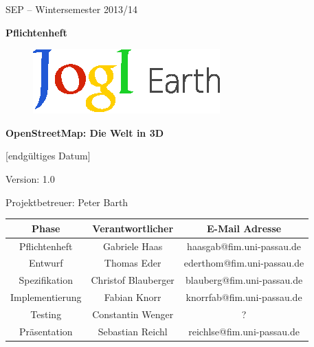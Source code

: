 \documentclass[10pt]{scrreprt}
\begin{document}
\begin{center}
\vspace{2.0 cm}
{\LARGE SEP – Wintersemester 2013/14}

\vspace{1.0 cm}
\textbf{{\Huge Pflichtenheft}}

\vspace{0.8 cm}
\begin{figure}[!htb]
\begin{center}
	\includegraphics[scale=1.5]{Logo-Print.eps}
\end{center}
\end{figure}

\vspace{0.2 cm}
\textbf{{\Huge OpenStreetMap: Die Welt in 3D}}

\vspace{1.5 cm}
[endgültiges Datum]

\vspace{0.5 cm}
Version: 1.0

\vspace{1.5 cm}
{\Large Projektbetreuer: Peter Barth}

\vspace{1.5 cm}
\begin{tabular}{|c|c|c|}
\hline 
\rule[-1ex]{0pt}{4ex} \textbf{Phase} & \textbf{Verantwortlicher} & \textbf{E-Mail Adresse} \\ 
\hline  \hline
\rule[-1ex]{0pt}{4ex} Pflichtenheft & Gabriele Haas & haasgab@fim.uni-passau.de \\ 
\hline  \hline
\rule[-1ex]{0pt}{4ex} Entwurf & Thomas Eder & ederthom@fim.uni-passau.de \\ 
\hline  \hline
\rule[-1ex]{0pt}{4ex} Spezifikation & Christof Blauberger & blauberg@fim.uni-passau.de \\ 
\hline  \hline
\rule[-1ex]{0pt}{4ex} Implementierung & Fabian Knorr & knorrfab@fim.uni-passau.de \\ 
\hline \hline 
\rule[-1ex]{0pt}{4ex} Testing & Constantin Wenger & ? \\ 
\hline  \hline
\rule[-1ex]{0pt}{4ex} Präsentation & Sebastian Reichl & reichlse@fim.uni-passau.de \\ 
\hline 
\end{tabular}

\end{center}
\end{document}
